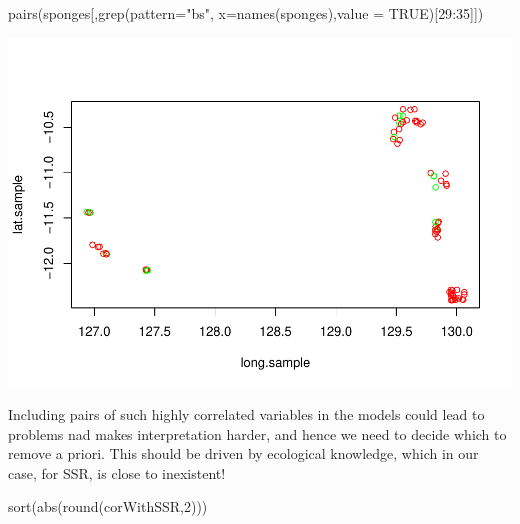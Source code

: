 \documentclass[
]{book}
\newenvironment{Shaded}{\begin{snugshade}}{\end{snugshade}}
\newcommand{\AttributeTok}[1]{\textcolor[rgb]{0.77,0.63,0.00}{#1}}
\newcommand{\ConstantTok}[1]{\textcolor[rgb]{0.00,0.00,0.00}{#1}}
\newcommand{\DecValTok}[1]{\textcolor[rgb]{0.00,0.00,0.81}{#1}}
\newcommand{\FunctionTok}[1]{\textcolor[rgb]{0.00,0.00,0.00}{#1}}
\newcommand{\NormalTok}[1]{#1}
\newcommand{\SpecialCharTok}[1]{\textcolor[rgb]{0.00,0.00,0.00}{#1}}
\newcommand{\StringTok}[1]{\textcolor[rgb]{0.31,0.60,0.02}{#1}}
\begin{document}
\begin{Shaded}
\begin{Highlighting}[]
\FunctionTok{pairs}\NormalTok{(sponges[,}\FunctionTok{grep}\NormalTok{(}\AttributeTok{pattern=}\StringTok{"bs"}\NormalTok{, }\AttributeTok{x=}\FunctionTok{names}\NormalTok{(sponges),}\AttributeTok{value =} \ConstantTok{TRUE}\NormalTok{)[}\DecValTok{29}\SpecialCharTok{:}\DecValTok{35}\NormalTok{]])}
\end{Highlighting}
\end{Shaded}

\includegraphics{ECOMODbook_files/figure-latex/unnamed-chunk-21-3.pdf}

Including pairs of such highly correlated variables in the models could lead to problems nad makes interpretation harder, and hence we need to decide which to remove a priori. This should be driven by ecological knowledge, which in our case, for SSR, is close to inexistent!

\begin{Shaded}
\begin{Highlighting}[]
\FunctionTok{sort}\NormalTok{(}\FunctionTok{abs}\NormalTok{(}\FunctionTok{round}\NormalTok{(corWithSSR,}\DecValTok{2}\NormalTok{)))}
\end{Highlighting}
\end{Shaded}
\end{document}
